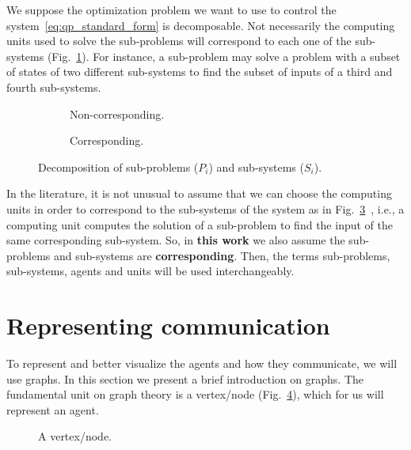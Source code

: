 \documentclass[../main.tex]{subfiles}
\begin{document}
We suppose the optimization problem we want to use to control the system~\eqref{eq:qp_standard_form} is decomposable.
Not necessarily the computing units used to solve the sub-problems will correspond to each one of the sub-systems (Fig.~\ref{fig:noncorresponding_division_system_problem}).
For instance, a sub-problem may solve a problem with a subset of states of two different sub-systems to find the subset of inputs of a third and fourth sub-systems.

\begin{figure}[h] \centering
  \begin{subfigure}{.4\textwidth}
    \centering
    \def\svgwidth{.8\textwidth}
    
    \caption{Non-corresponding.}\label{fig:noncorresponding_division_system_problem}
  \end{subfigure} \hfill
  \begin{subfigure}{.4\textwidth} \centering
    \def\svgwidth{.8\textwidth}
    
    \caption{Corresponding.}\label{fig:corresponding_division_system_problem}
  \end{subfigure}
  \caption{Decomposition of sub-problems ($P_i$) and
    sub-systems ($S_{i}$).}
\end{figure}

In the literature, it is not unusual to assume that we can choose the computing units in order to correspond to the sub-systems of the system as in Fig.~\ref{fig:corresponding_division_system_problem}~\cite{ArauzEtAl2021}, i.e., a computing unit computes the solution of a sub-problem to find the input of the same corresponding sub-system.
So, in \textbf{this work} we also assume the sub-problems and sub-systems are \textbf{corresponding}.
Then, the terms sub-problems, sub-systems, agents and units will be used interchangeably.

\section{Representing communication}

To represent and better visualize the agents and how they communicate, we will use graphs. In this section we present a brief introduction on graphs.
The fundamental unit on graph theory is a vertex/node (Fig.~\ref{fig:node}), which for us will represent an agent.
\begin{figure}[h]
  \centering
  \scalebox{1.25}
  {
  }
  \caption{A vertex/node.}\label{fig:node}
\end{figure}
\end{document}
